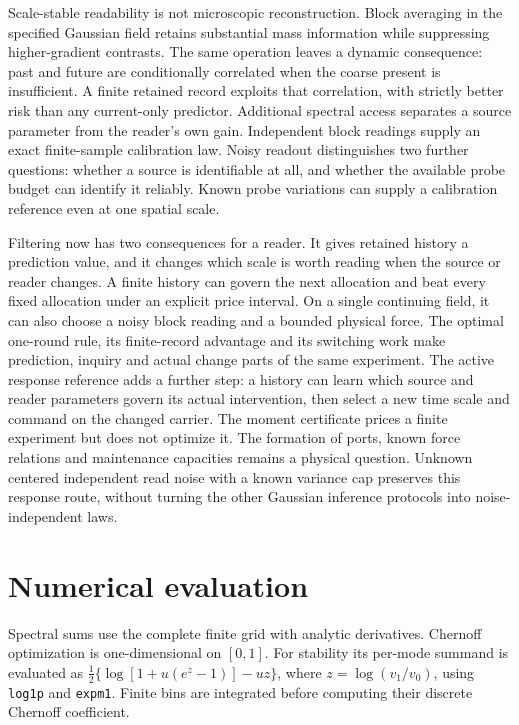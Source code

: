 \documentclass[12pt,a4paper]{article}
\begin{document}
Scale-stable readability is not microscopic reconstruction.
Block averaging in the specified Gaussian field retains substantial
mass information while suppressing higher-gradient contrasts.
The same operation leaves a dynamic consequence: past and future are
conditionally correlated when the coarse present is insufficient.
A finite retained record exploits that correlation, with strictly
better risk than any current-only predictor. Additional spectral
access separates a source parameter from the reader's own gain.
Independent block readings supply an exact finite-sample calibration
law. Noisy readout distinguishes two further questions: whether a
source is identifiable at all, and whether the available probe budget
can identify it reliably. Known probe variations can supply a
calibration reference even at one spatial scale.

Filtering now has two consequences for a reader. It gives retained
history a prediction value, and it changes which scale is worth
reading when the source or reader changes. A finite history can govern
the next allocation and beat every fixed allocation under an explicit
price interval. On a single continuing field, it can also choose a
noisy block reading and a bounded physical force. The optimal
one-round rule, its finite-record advantage and its switching work
make prediction, inquiry and actual change parts of the same
experiment. The active response reference adds a further step:
a history can learn which source and reader parameters govern its
actual intervention, then select a new time scale and command on
the changed carrier. The moment certificate prices a finite experiment
but does not optimize it. The formation of ports, known force
relations and maintenance capacities remains a physical question.
Unknown centered independent read noise with a known variance cap
preserves this response route, without turning the other Gaussian
inference protocols into noise-independent laws.

\appendix
\section{Numerical evaluation}

Spectral sums use the complete finite grid with analytic derivatives.
Chernoff optimization is one-dimensional on $[0,1]$. For stability its
per-mode summand is evaluated as
$\frac12\{\log[1+u(e^z-1)]-uz\}$, where $z=\log(v_1/v_0)$,
using \texttt{log1p} and \texttt{expm1}. Finite bins are integrated
before computing their discrete Chernoff coefficient.
\end{document}
